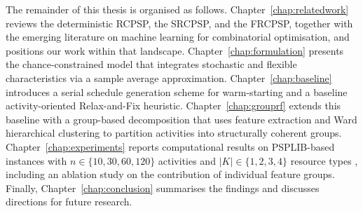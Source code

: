 The remainder of this thesis is organised as follows.
Chapter~\ref{chap:relatedwork} reviews the deterministic RCPSP,
the SRCPSP, and the FRCPSP, together with the emerging literature
on machine learning for combinatorial optimisation, and positions
our work within that landscape.
Chapter~\ref{chap:formulation} presents the chance-constrained
model that integrates stochastic and flexible characteristics via a
sample average approximation.
Chapter~\ref{chap:baseline} introduces a serial schedule generation
scheme for warm-starting and a baseline activity-oriented
Relax-and-Fix heuristic.
Chapter~\ref{chap:grouprf} extends this baseline with a group-based
decomposition that uses feature extraction and Ward hierarchical
clustering to partition activities into structurally coherent
groups.
Chapter~\ref{chap:experiments} reports computational results on
PSPLIB-based instances with $n \in \{10, 30, 60, 120\}$ activities and
$|K| \in \{1, 2, 3, 4\}$ resource types
\parencite{KolischSprecher1997}, including an ablation study on the
contribution of individual feature groups.
Finally, Chapter~\ref{chap:conclusion} summarises the findings and
discusses directions for future research.
